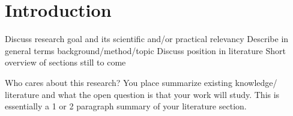 \chapter{Introduction}

Discuss research goal and its scientific and/or practical relevancy
Describe in general terms background/method/topic
Discuss position in literature
Short overview of sections still to come

Who cares about this research?
You place summarize
existing knowledge/
literature and what the open
question is that your work
will study. This is essentially a 1 or 2 paragraph summary
of your literature section.